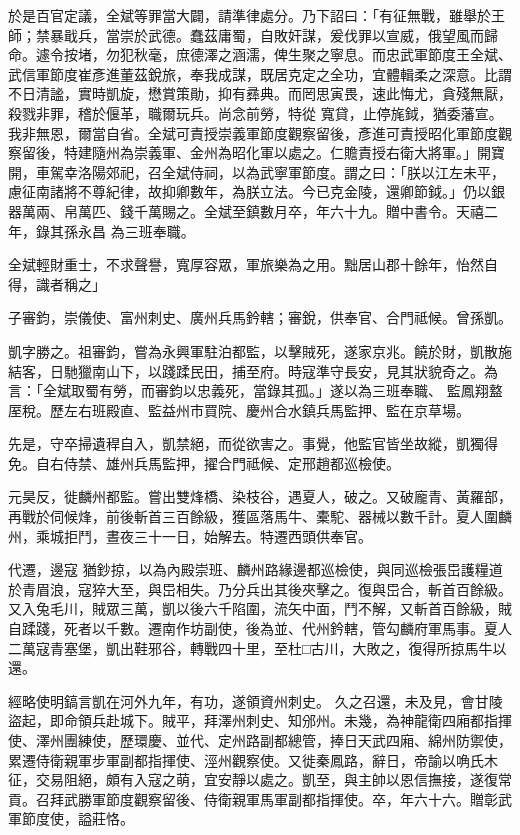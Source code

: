 \begin{pinyinscope}
 於是百官定議，全斌等罪當大闢，請準律處分。乃下詔曰：「有征無戰，雖舉於王師；禁暴戢兵，當崇於武德。蠢茲庸蜀，自敗奸謀，爰伐罪以宣威，俄望風而歸命。遽令按堵，勿犯秋毫，庶德澤之涵濡，俾生聚之寧息。而忠武軍節度王全斌、武信軍節度崔彥進董茲銳旅，奉我成謀，既居克定之全功，宜體輯柔之深意。比謂不日清謐，實時凱旋，懋賞策勛，抑有彞典。而罔思寅畏，速此悔尤，貪殘無厭，殺戮非罪，稽於偃革，職爾玩兵。尚念前勞，特從
 寬貸，止停旄鉞，猶委藩宣。我非無恩，爾當自省。全斌可責授崇義軍節度觀察留後，彥進可責授昭化軍節度觀察留後，特建隨州為崇義軍、金州為昭化軍以處之。仁贍責授右衛大將軍。」開寶開，車駕幸洛陽郊祀，召全斌侍祠，以為武寧軍節度。謂之曰：「朕以江左未平，慮征南諸將不尊紀律，故抑卿數年，為朕立法。今已克金陵，還卿節鉞。」仍以銀器萬兩、帛萬匹、錢千萬賜之。全斌至鎮數月卒，年六十九。贈中書令。天禧二年，錄其孫永昌
 為三班奉職。



 全斌輕財重士，不求聲譽，寬厚容眾，軍旅樂為之用。黜居山郡十餘年，怡然自得，識者稱之」



 子審鈞，崇儀使、富州刺史、廣州兵馬鈐轄；審銳，供奉官、合門祗候。曾孫凱。



 凱字勝之。祖審鈞，嘗為永興軍駐泊都監，以擊賊死，遂家京兆。饒於財，凱散施結客，日馳獵南山下，以踐蹂民田，捕至府。時寇準守長安，見其狀貌奇之。為言：「全斌取蜀有勞，而審鈞以忠義死，當錄其孤。」遂以為三班奉職、
 監鳳翔盩厔稅。歷左右班殿直、監益州市買院、慶州合水鎮兵馬監押、監在京草場。



 先是，守卒掃遺稈自入，凱禁絕，而從欲害之。事覺，他監官皆坐故縱，凱獨得免。自右侍禁、雄州兵馬監押，擢合門祗候、定邢趙都巡檢使。



 元昊反，徙麟州都監。嘗出雙烽橋、染枝谷，遇夏人，破之。又破龐青、黃羅部，再戰於伺候烽，前後斬首三百餘級，獲區落馬牛、橐駝、器械以數千計。夏人圍麟州，乘城拒鬥，晝夜三十一日，始解去。特遷西頭供奉官。



 代遷，邊寇
 猶鈔掠，以為內殿崇班、麟州路緣邊都巡檢使，與同巡檢張岊護糧道於青眉浪，寇猝大至，與岊相失。乃分兵出其後夾擊之。復與岊合，斬首百餘級。又入兔毛川，賊眾三萬，凱以後六千陷圍，流矢中面，鬥不解，又斬首百餘級，賊自蹂踐，死者以千數。遷南作坊副使，後為並、代州鈐轄，管勾麟府軍馬事。夏人二萬寇青塞堡，凱出鞋邪谷，轉戰四十里，至杜□古川，大敗之，復得所掠馬牛以還。



 經略使明鎬言凱在河外九年，有功，遂領資州刺史。
 久之召還，未及見，會甘陵盜起，即命領兵赴城下。賊平，拜澤州刺史、知邠州。未幾，為神龍衛四廂都指揮使、澤州團練使，歷環慶、並代、定州路副都總管，捧日天武四廂、綿州防禦使，累遷侍衛親軍步軍副都指揮使、涇州觀察使。又徙秦鳳路，辭日，帝諭以唃氏木征，交易阻絕，頗有入寇之萌，宜安靜以處之。凱至，與主帥以恩信撫接，遂復常貢。召拜武勝軍節度觀察留後、侍衛親軍馬軍副都指揮使。卒，年六十六。贈彰武軍節度使，謚莊恪。




\end{pinyinscope}
